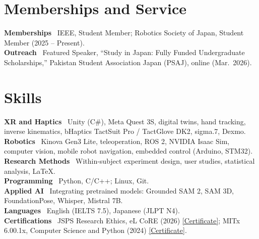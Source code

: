 \documentclass[11pt,a4paper]{article}
\let\cvorigsection\section
\renewcommand{\section}[1]{\Needspace{6\baselineskip}\cvorigsection{#1}}
\newcommand{\lab}[1]{\textbf{#1}\ }
\begin{document}
\section{Memberships and Service}

\lab{Memberships} IEEE, Student Member; Robotics Society of Japan, Student Member (2025 -- Present).\\
\lab{Outreach} Featured Speaker, ``Study in Japan: Fully Funded Undergraduate Scholarships,'' Pakistan
Student Association Japan (PSAJ), online (Mar.\ 2026).

\section{Skills}

\lab{XR and Haptics} Unity (C\#), Meta Quest 3S, digital twins, hand tracking, inverse kinematics,
bHaptics TactSuit Pro / TactGlove DK2, sigma.7, Dexmo.\\
\lab{Robotics} Kinova Gen3 Lite, teleoperation, ROS 2, NVIDIA Isaac Sim, computer vision, mobile robot
navigation, embedded control (Arduino, STM32).\\
\lab{Research Methods} Within-subject experiment design, user studies, statistical analysis, \LaTeX.\\
\lab{Programming} Python, C/C++; Linux, Git.\\
\lab{Applied AI} Integrating pretrained models: Grounded SAM 2, SAM 3D, FoundationPose, Whisper,
Mistral 7B.\\
\lab{Languages} English (IELTS 7.5), Japanese (JLPT N4).\\
\lab{Certifications} JSPS Research Ethics, eL CoRE (2026)
\href{https://zahidmabdullah.github.io/assets/certificates/zahid-2026-jsps-elcore-research-ethics-certificate.pdf}{[Certificate]};
MITx 6.00.1x, Computer Science and Python (2024)
\href{https://courses.edx.org/certificates/9ee1f4959cd14ef0beca032932c73867}{[Certificate]}.
\end{document}
